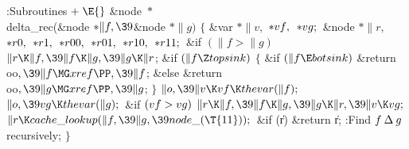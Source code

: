 \Y\B\4:Subroutines\X${}\mathrel+\E{}$\6
\&{node} ${}{*}{}$\\{delta\_rec}(\&{node} ${}{*}\|f,\39{}$\&{node} ${}{*}%
\|g){}$\1\1\2\2\6
${}\{{}$\1\6
\&{var} ${}{*}\|v,{}$ ${}{*}\\{vf},{}$ ${}{*}\\{vg};{}$\6
\&{node} ${}{*}\|r,{}$ ${}{*}\\{r0},{}$ ${}{*}\\{r1},{}$ ${}{*}\\{r00},{}$
${}{*}\\{r01},{}$ ${}{*}\\{r10},{}$ ${}{*}\\{r11};{}$\7
\&{if} ${}(\|f>\|g){}$\1\5
${}\|r\K\|f,\39\|f\K\|g,\39\|g\K\|r{}$;\2\6
\&{if} ${}(\|f\Z\\{topsink}){}$\5
${}\{{}$\1\6
\&{if} ${}(\|f\E\\{botsink}){}$\1\5
\&{return} \\{oo}${},\39\|f\MG\\{xref}\PP,\39\|f{}$;\2\6
\&{else}\1\5
\&{return} \\{oo}${},\39\|g\MG\\{xref}\PP,\39\|g{}$;\2\6
\4${}\}{}$\2\6
${}\|o,\39\|v\K\\{vf}\K\\{thevar}(\|f);{}$\6
${}\|o,\39\\{vg}\K\\{thevar}(\|g);{}$\6
\&{if} ${}(\\{vf}>\\{vg}){}$\1\5
${}\|r\K\|f,\39\|f\K\|g,\39\|g\K\|r,\39\|v\K\\{vg};{}$\2\6
${}\|r\K\\{cache\_lookup}(\|f,\39\|g,\39\\{node\_}(\T{11}));{}$\6
\&{if} (\|r)\1\5
\&{return} \|r;\2\6
:Find $f\mathbin{\Delta} g$ recursively\X;\6
\4${}\}{}$\2\par
\fi

